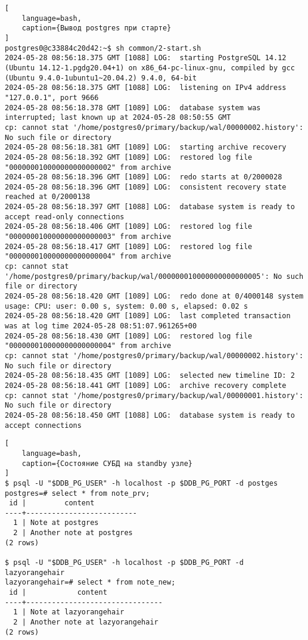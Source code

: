 \documentclass{article}
\begin{document}
\begin{lstlisting}[
    language=bash,
    caption={Вывод postgres при старте}
]
postgres0@c33884c20d42:~$ sh common/2-start.sh 
2024-05-28 08:56:18.375 GMT [1088] LOG:  starting PostgreSQL 14.12 (Ubuntu 14.12-1.pgdg20.04+1) on x86_64-pc-linux-gnu, compiled by gcc (Ubuntu 9.4.0-1ubuntu1~20.04.2) 9.4.0, 64-bit
2024-05-28 08:56:18.375 GMT [1088] LOG:  listening on IPv4 address "127.0.0.1", port 9666
2024-05-28 08:56:18.378 GMT [1089] LOG:  database system was interrupted; last known up at 2024-05-28 08:50:55 GMT
cp: cannot stat '/home/postgres0/primary/backup/wal/00000002.history': No such file or directory
2024-05-28 08:56:18.381 GMT [1089] LOG:  starting archive recovery
2024-05-28 08:56:18.392 GMT [1089] LOG:  restored log file "000000010000000000000002" from archive
2024-05-28 08:56:18.396 GMT [1089] LOG:  redo starts at 0/2000028
2024-05-28 08:56:18.396 GMT [1089] LOG:  consistent recovery state reached at 0/2000138
2024-05-28 08:56:18.397 GMT [1088] LOG:  database system is ready to accept read-only connections
2024-05-28 08:56:18.406 GMT [1089] LOG:  restored log file "000000010000000000000003" from archive
2024-05-28 08:56:18.417 GMT [1089] LOG:  restored log file "000000010000000000000004" from archive
cp: cannot stat '/home/postgres0/primary/backup/wal/000000010000000000000005': No such file or directory
2024-05-28 08:56:18.420 GMT [1089] LOG:  redo done at 0/4000148 system usage: CPU: user: 0.00 s, system: 0.00 s, elapsed: 0.02 s
2024-05-28 08:56:18.420 GMT [1089] LOG:  last completed transaction was at log time 2024-05-28 08:51:07.961265+00
2024-05-28 08:56:18.430 GMT [1089] LOG:  restored log file "000000010000000000000004" from archive
cp: cannot stat '/home/postgres0/primary/backup/wal/00000002.history': No such file or directory
2024-05-28 08:56:18.435 GMT [1089] LOG:  selected new timeline ID: 2
2024-05-28 08:56:18.441 GMT [1089] LOG:  archive recovery complete
cp: cannot stat '/home/postgres0/primary/backup/wal/00000001.history': No such file or directory
2024-05-28 08:56:18.450 GMT [1088] LOG:  database system is ready to accept connections
\end{lstlisting}

\begin{lstlisting}[
    language=bash,
    caption={Состояние СУБД на standby узле}
]
$ psql -U "$DDB_PG_USER" -h localhost -p $DDB_PG_PORT -d postges 
postgres=# select * from note_prv;
 id |         content          
----+--------------------------
  1 | Note at postgres
  2 | Another note at postgres
(2 rows)

$ psql -U "$DDB_PG_USER" -h localhost -p $DDB_PG_PORT -d lazyorangehair
lazyorangehair=# select * from note_new;
 id |            content             
----+--------------------------------
  1 | Note at lazyorangehair
  2 | Another note at lazyorangehair
(2 rows)
\end{lstlisting}
\end{document}
